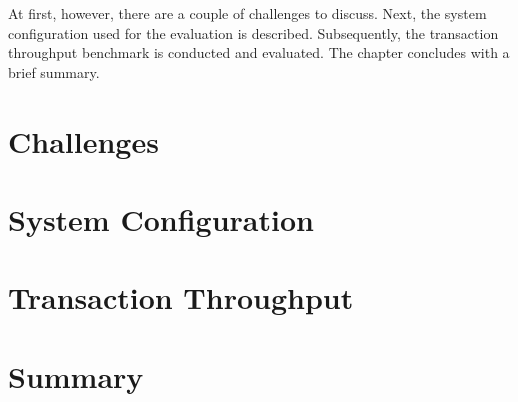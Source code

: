 At first, however, there are a couple of challenges to discuss. Next, the system
configuration used for the evaluation is described. Subsequently, the
transaction throughput benchmark is conducted and evaluated. The chapter
concludes with a brief summary.


\section{Challenges}
\label{ch:eval-challenges}


\section{System Configuration}
\label{ch:eval-sysconfig}


% 

\section{Transaction Throughput}
\label{ch:eval-ttp}


\section{Summary}
\label{ch:eval-summary}

